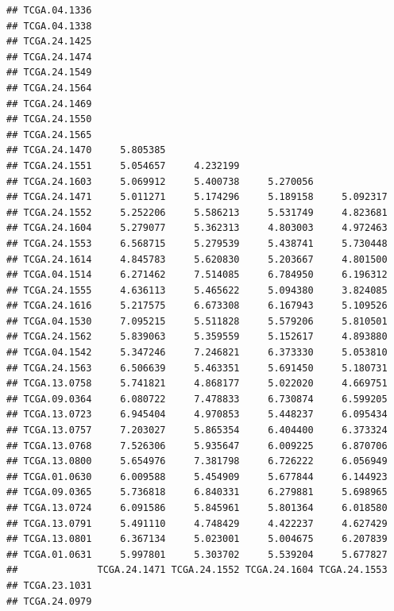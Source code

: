 \documentclass[UTF8]{beamer}\usepackage[]{graphicx}\usepackage[]{color}
\makeatletter
\newenvironment{kframe}{%
 \def\at@end@of@kframe{}%
 \ifinner\ifhmode%
  \def\at@end@of@kframe{\end{minipage}}%
  \begin{minipage}{\columnwidth}%
 \fi\fi%
 \def\FrameCommand##1{\hskip\@totalleftmargin \hskip-\fboxsep
 \colorbox{shadecolor}{##1}\hskip-\fboxsep
     \hskip-\linewidth \hskip-\@totalleftmargin \hskip\columnwidth}%
 \MakeFramed {\advance\hsize-\width
   \@totalleftmargin\z@ \linewidth\hsize
   \@setminipage}}%
 {\par\unskip\endMakeFramed%
 \at@end@of@kframe}
\newenvironment{knitrout}{}{} %
\makeatother
\begin{document}
\begin{frame}[fragile]
\begin{knitrout}
\begin{kframe}
\begin{verbatim}
## TCGA.04.1336                                                    
## TCGA.04.1338                                                    
## TCGA.24.1425                                                    
## TCGA.24.1474                                                    
## TCGA.24.1549                                                    
## TCGA.24.1564                                                    
## TCGA.24.1469                                                    
## TCGA.24.1550                                                    
## TCGA.24.1565                                                    
## TCGA.24.1470     5.805385                                       
## TCGA.24.1551     5.054657     4.232199                          
## TCGA.24.1603     5.069912     5.400738     5.270056             
## TCGA.24.1471     5.011271     5.174296     5.189158     5.092317
## TCGA.24.1552     5.252206     5.586213     5.531749     4.823681
## TCGA.24.1604     5.279077     5.362313     4.803003     4.972463
## TCGA.24.1553     6.568715     5.279539     5.438741     5.730448
## TCGA.24.1614     4.845783     5.620830     5.203667     4.801500
## TCGA.04.1514     6.271462     7.514085     6.784950     6.196312
## TCGA.24.1555     4.636113     5.465622     5.094380     3.824085
## TCGA.24.1616     5.217575     6.673308     6.167943     5.109526
## TCGA.04.1530     7.095215     5.511828     5.579206     5.810501
## TCGA.24.1562     5.839063     5.359559     5.152617     4.893880
## TCGA.04.1542     5.347246     7.246821     6.373330     5.053810
## TCGA.24.1563     6.506639     5.463351     5.691450     5.180731
## TCGA.13.0758     5.741821     4.868177     5.022020     4.669751
## TCGA.09.0364     6.080722     7.478833     6.730874     6.599205
## TCGA.13.0723     6.945404     4.970853     5.448237     6.095434
## TCGA.13.0757     7.203027     5.865354     6.404400     6.373324
## TCGA.13.0768     7.526306     5.935647     6.009225     6.870706
## TCGA.13.0800     5.654976     7.381798     6.726222     6.056949
## TCGA.01.0630     6.009588     5.454909     5.677844     6.144923
## TCGA.09.0365     5.736818     6.840331     6.279881     5.698965
## TCGA.13.0724     6.091586     5.845961     5.801364     6.018580
## TCGA.13.0791     5.491110     4.748429     4.422237     4.627429
## TCGA.13.0801     6.367134     5.023001     5.004675     6.207839
## TCGA.01.0631     5.997801     5.303702     5.539204     5.677827
##              TCGA.24.1471 TCGA.24.1552 TCGA.24.1604 TCGA.24.1553
## TCGA.23.1031                                                    
## TCGA.24.0979                                                    

\end{verbatim}
\end{kframe}
\end{knitrout}
\end{frame}
\end{document}
